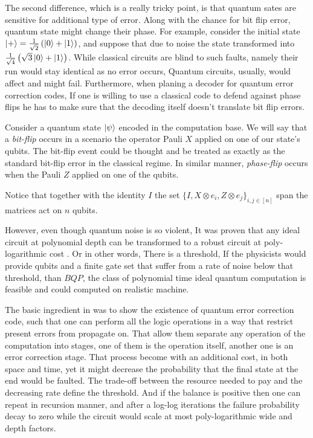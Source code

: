 The second difference, which is a really tricky point, is that quantum sates are sensitive for additional type of error. Along with the chance for bit flip error, quantum state might change their phase. For example, consider the initial state $\ket{+} = \frac{1}{\sqrt{2}}\left( \ket{0} + \ket{1} \right)$, and suppose that due to noise the state transformed into $\frac{1}{\sqrt{4}}\left( \sqrt{3}\ket{0} + \ket{1} \right)$. While classical circuits are blind to such faults, namely their run would stay identical as no error occurs, Quantum circuits, usually, would affect and might fail. Furthermore, when planing a decoder for quantum error correction codes, If one is willing to use a classical code to defend against phase flips he has to make sure that the decoding itself doesn't translate bit flip errors. 
\begin{definition} \label{def:bphf}  
  Consider a quantum state $\ket{\psi}$ encoded in the computation base. We will say that a \textit{bit-flip} occurs in a scenario the operator Pauli $X$ applied on one of our state's qubits. The bit-flip event could be thought and be treated as exactly as the standard bit-flip error in the classical regime. In similar manner, \textit{phase-flip} occurs when the Pauli $Z$ applied on one of the qubits. 

  Notice that together with the identity $I$ the set $\{I, X \otimes e_{i} , Z \otimes e_{j} \}_{i,j \in [n]}$ span the matrices act on $n$ qubits.  
\end{definition}

However, even though quantum noise is so violent, It was proven that any ideal circuit at polynomial depth can be transformed to a robust circuit at poly-logarithmic cost \cite{aharonov1999faulttolerant}. Or in other words, There is a threshold, If the physicists would provide qubits and a finite gate set that suffer from a rate of noise below that threshold, than $BQP$, the class of polynomial time ideal quantum computation is feasible and could computed on realistic machine.                

The basic ingredient in \cite{aharonov1999faulttolerant} was to show the existence of quantum error correction code, such that one can perform all the logic operations in a way that restrict present errors from propagate on. That allow them separate any operation of the computation into stages, one of them is the operation itself, another one is an error correction stage. That process become with an additional cost, in both space and time, yet it might decrease the probability that the final state at the end would be faulted. The trade-off between the resource needed to pay and the decreasing rate define the threshold. And if the balance is positive then one can repeat in recursion manner, and after a log-log iterations the failure probability decay to zero while the circuit would scale at most poly-logarithmic wide and depth factors.      

